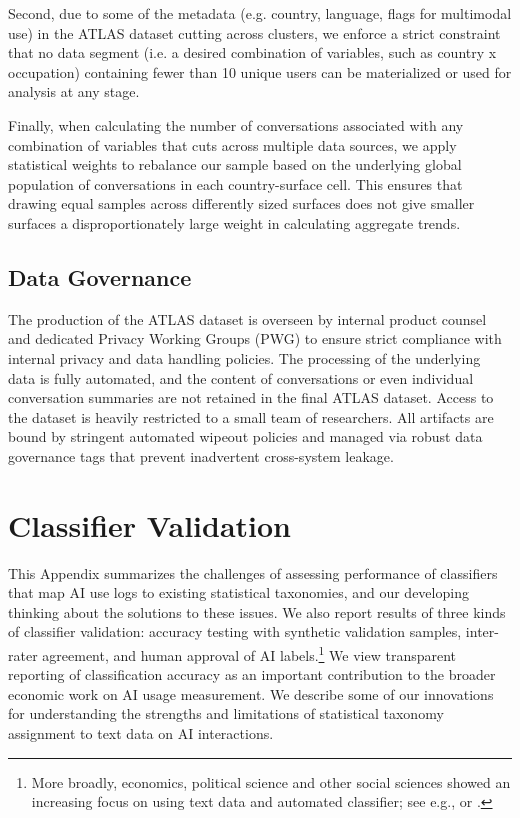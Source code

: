 \documentclass[11pt,a4paper]{article}
\begin{document}
Second, due to some of the metadata (e.g. country, language, flags for multimodal use) in the ATLAS dataset cutting across clusters, we enforce a strict constraint that no data segment (i.e. a desired combination of variables, such as country x occupation) containing fewer than 10 unique users can be materialized or used for analysis at any stage.  


Finally, when calculating the number of conversations associated with any combination of variables that cuts across multiple data sources, we apply statistical weights to rebalance our sample based on the underlying global population of conversations in each country-surface cell. This ensures that drawing equal samples across differently sized surfaces does not give smaller surfaces a disproportionately large weight in calculating aggregate trends. 

\subsection{Data Governance}
The production of the ATLAS dataset is overseen by internal product counsel and dedicated Privacy Working Groups (PWG) to ensure strict compliance with internal privacy and data handling policies.  The processing of the underlying data is fully automated, and the content of conversations or even individual conversation summaries are not retained in the final ATLAS dataset. Access to the dataset is heavily restricted to a small team of researchers. All artifacts are bound by stringent automated wipeout policies and managed via robust data governance tags that prevent inadvertent cross-system leakage.

\pagebreak

\section{Classifier Validation}
\label{app:classifier_validation}

This Appendix summarizes the challenges of assessing performance of classifiers that map AI use logs to existing statistical taxonomies, and our developing thinking about the solutions to these issues. We also report results of three kinds of classifier validation: accuracy testing with synthetic validation samples, inter-rater agreement, and human approval of AI labels.\footnote{More broadly, economics, political science and other social sciences showed an increasing focus on using text data and automated classifier; see e.g., \citet{Grimmer2022} or \citet{10.1257/jel.20181020}.} We view transparent reporting of classification accuracy as an important contribution to the broader economic work on AI usage measurement. We describe some of our innovations for understanding the strengths and limitations of statistical taxonomy assignment to text data on AI interactions.
\end{document}
